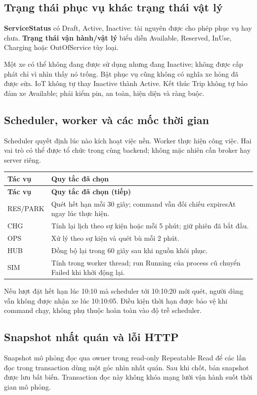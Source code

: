 \documentclass[12pt,a4paper]{article}
\newcommand{\Term}[1]{\textbf{#1}}
\newenvironment{PairTable}[2]{%
  \begin{longtable}{|L{39mm}|L{106mm}|}\hline
  \textbf{#1} & \textbf{#2}\\\hline\endfirsthead
  \hline\textbf{#1} & \textbf{#2 (tiếp)}\\\hline\endhead
}{\end{longtable}}
\begin{document}
\subsection{Trạng thái phục vụ khác trạng thái vật lý}
\Term{ServiceStatus} có Draft, Active, Inactive: tài nguyên được cho phép phục vụ hay chưa. \Term{Trạng thái vận hành/vật lý} biểu diễn Available, Reserved, InUse, Charging hoặc OutOfService tùy loại.

Một xe có thể không đang được sử dụng nhưng đang Inactive; không được cấp phát chỉ vì nhìn thấy nó trống. Bật phục vụ cũng không có nghĩa xe hỏng đã được sửa. IoT không tự thay Inactive thành Active. Kết thúc Trip không tự bảo đảm xe Available; phải kiểm pin, an toàn, hiện diện và ràng buộc.

\subsection{Scheduler, worker và các mốc thời gian}
Scheduler quyết định lúc nào kích hoạt việc nền. Worker thực hiện công việc. Hai vai trò có thể được tổ chức trong cùng backend; không mặc nhiên cần broker hay server riêng.

\begin{PairTable}{Tác vụ}{Quy tắc đã chọn}
RES/PARK & Quét hết hạn mỗi 30 giây; command vẫn đối chiếu expiresAt ngay lúc thực hiện.\\\hline
CHG & Tính lại lịch theo sự kiện hoặc mỗi 5 phút; giữ phiên đã bắt đầu.\\\hline
OPS & Xử lý theo sự kiện và quét bù mỗi 2 phút.\\\hline
HUB & Đồng bộ lại trong 60 giây sau khi nguồn khôi phục.\\\hline
SIM & Tính trong worker thread; run Running của process cũ chuyển Failed khi khởi động lại.\\\hline
\end{PairTable}

Nếu lượt đặt hết hạn lúc 10:10 mà scheduler tới 10:10:20 mới quét, người dùng vẫn không được nhận xe lúc 10:10:05. Điều kiện thời hạn được bảo vệ khi command chạy, không phụ thuộc hoàn toàn vào độ trễ scheduler.

\subsection{Snapshot nhất quán và lỗi HTTP}
Snapshot mô phỏng đọc qua owner trong read-only Repeatable Read để các lần đọc trong transaction dùng một góc nhìn nhất quán. Sau khi chốt, bản snapshot được lưu bất biến. Transaction đọc này không khóa mạng lưới vận hành suốt thời gian mô phỏng.
\end{document}

